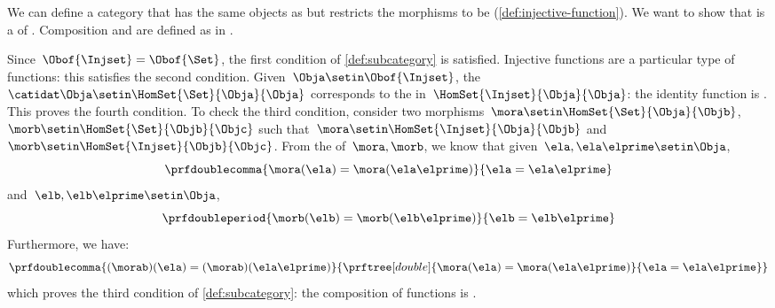 \begin{example}
    \label{ex:Injset}
    We can define a category \Injset that has the same objects as \Set but restricts the morphisms to be \emph{} (\cref{def:injective-function}).
    We want to show that \Injset is a  of \Set.
    Composition and   are defined as in \Set.

    Since~$\Obof{\Injset}=\Obof{\Set}$, the first condition of \cref{def:subcategory} is satisfied.
    Injective functions are a particular type of functions: this satisfies the second condition.
    Given~$\Obja\setin \Obof{\Injset}$, the ~$\catidat\Obja\setin \HomSet{\Set}{\Obja}{\Obja}$ corresponds to the  in~$\HomSet{\Injset}{\Obja}{\Obja}$: the identity function is .
    This proves the fourth condition.
    To check the third condition, consider two morphisms~$\mora \setin \HomSet{\Set}{\Obja}{\Objb}$,~$\morb \setin \HomSet{\Set}{\Objb}{\Objc}$ such that~$\mora \setin \HomSet{\Injset}{\Obja}{\Objb}$ and~$\morb\setin \HomSet{\Injset}{\Objb}{\Objc}$.
    From the  of~$\mora,\morb$, we know that given~$\ela,\ela\elprime\setin \Obja$,
    \begin{equation}
        \prfdoublecomma{
            \mora(\ela)=\mora(\ela\elprime)
        }{
            \ela=\ela\elprime
        }
    \end{equation}
    and~$\elb,\elb\elprime\setin \Obja$,
    \begin{equation}
        \prfdoubleperiod{
            \morb(\elb)=\morb(\elb\elprime)
        }{
            \elb=\elb\elprime
        }
    \end{equation}
    Furthermore, we have:
    \begin{equation}
        \prfdoublecomma{
            (\morab)(\ela)
            =(\morab)(\ela\elprime)
        }{
            \prftree[double]{
                \mora(\ela)=\mora(\ela\elprime)
            }{
                \ela=\ela\elprime
            }
        }
    \end{equation}
    which proves the third condition of \cref{def:subcategory}: the composition of  functions is .
\end{example}

